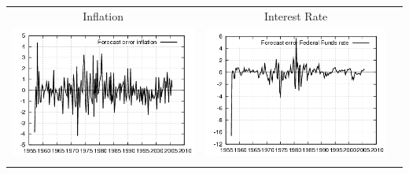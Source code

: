 \documentclass{beamer}
\begin{document}
{\begin{center}
\begin{tabular}{ccc}
  \small{Inflation} & \small{Interest Rate} & \\
  \includegraphics[scale=0.23]{plots2/cap_initest_Forecast_error_inflation.png} & \includegraphics[scale=0.23]{plots2/cap_initest_Forecast_error_Federal_Funds_rate.png} & \\ \\
  \end{tabular}
  \end{center}
}
\end{document}
